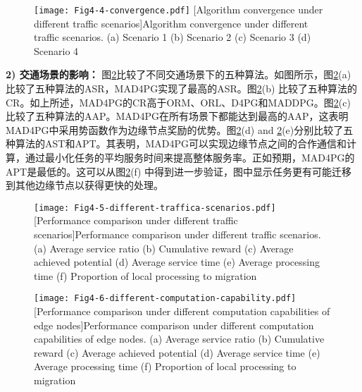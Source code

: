 \begin{figure}[h]
\centering
  \texttt{[image: Fig4-4-convergence.pdf]}
  [Algorithm convergence under different traffic scenarios]{Algorithm convergence under different traffic scenarios. (a) Scenario 1 (b) Scenario 2 (c) Scenario 3 (d) Scenario 4}
  \label{fig 4-4}
\end{figure} 

\textbf{2) 交通场景的影响：} 图\ref{fig 4-5}比较了不同交通场景下的五种算法。如图所示，图\ref{fig 4-5}(a)比较了五种算法的ASR，MAD4PG实现了最高的ASR。图\ref{fig 4-5}(b) 比较了五种算法的CR。如上所述，MAD4PG的CR高于ORM、ORL、D4PG和MADDPG。图\ref{fig 4-5}(c) 比较了五种算法的AAP。MAD4PG在所有场景下都能达到最高的AAP，这表明MAD4PG中采用势函数作为边缘节点奖励的优势。图\ref{fig 4-5}(d) and \ref{fig 4-5}(e)分别比较了五种算法的AST和APT。其表明，MAD4PG可以实现边缘节点之间的合作通信和计算，通过最小化任务的平均服务时间来提高整体服务率。正如预期，MAD4PG的APT是最低的。这可以从图\ref{fig 4-5}(f) 中得到进一步验证，图中显示任务更有可能迁移到其他边缘节点以获得更快的处理。

\begin{figure}[h]
\centering
  \texttt{[image: Fig4-5-different-traffica-scenarios.pdf]}
  [Performance comparison under different traffic scenarios]{Performance comparison under different traffic scenarios. (a) Average service ratio (b) Cumulative reward (c) Average achieved potential (d) Average service time (e) Average processing time (f) Proportion of local processing to migration}
  \label{fig 4-5}
\end{figure}

\begin{figure}[h]
\centering
  \texttt{[image: Fig4-6-different-computation-capability.pdf]}
  [Performance comparison under different computation capabilities of edge nodes]{Performance comparison under different computation capabilities of edge nodes. (a) Average service ratio (b) Cumulative reward (c) Average achieved potential (d) Average service time (e) Average processing time (f) Proportion of local processing to migration}
  \label{fig 4-6}
\end{figure}

